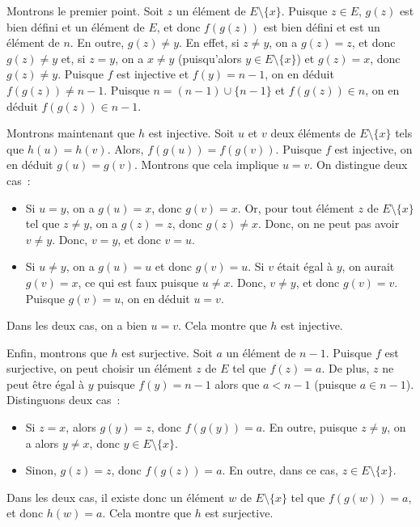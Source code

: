     Montrons le premier point. 
    Soit $z$ un élément de $E \setminus \lbrace x \rbrace$. 
    Puisque $z \in E$, $g(z)$ est bien défini et un élément de $E$, et donc $f(g(z))$ est bien défini et est un élément de $n$. 
    En outre, $g(z) \neq y$. 
    En effet, si $z \neq y$, on a $g(z) = z$, et donc $g(z) \neq y$ et, si $z = y$, on a $x \neq y$ (puisqu'alors $y \in E \setminus \lbrace x \rbrace$) et $g(z) = x$, donc $g(z) \neq y$. 
    Puisque $f$ est injective et $f(y) = n-1$, on en déduit $f(g(z)) \neq n-1$. 
    Puisque $n = (n-1) \cup \lbrace n-1 \rbrace$ et $f(g(z)) \in n$, on en déduit $f(g(z)) \in n-1$. 

    Montrons maintenant que $h$ est injective. 
    Soit $u$ et $v$ deux éléments de $E \setminus \lbrace x \rbrace$ tels que $h(u) = h(v)$. 
    Alors, $f(g(u)) = f(g(v))$. 
    Puisque $f$ est injective, on en déduit $g(u) = g(v)$. 
    Montrons que cela implique $u = v$. 
    On distingue deux cas : 
    \begin{itemize}[nosep]
        \item Si $u = y$, on a $g(u) = x$, donc $g(v) = x$. 
            Or, pour tout élément $z$ de $E \setminus \lbrace x \rbrace$ tel que $z \neq y$, on a $g(z) = z$, donc $g(z) \neq x$.
            Donc, on ne peut pas avoir $v \neq y$. 
            Donc, $v = y$, et donc $v = u$.
        \item Si $u \neq y$, on a $g(u) = u$ et donc $g(v) = u$.
            Si $v$ était égal à $y$, on aurait $g(v) = x$, ce qui est faux puisque $u \neq x$. 
            Donc, $v \neq y$, et donc $g(v) = v$. 
            Puisque $g(v) = u$, on en déduit $u = v$.
    \end{itemize}
    Dans les deux cas, on a bien $u = v$. 
    Cela montre que $h$ est injective. 

    Enfin, montrons que $h$ est surjective. 
    Soit $a$ un élément de $n-1$. 
    Puisque $f$ est surjective, on peut choisir un élément $z$ de $E$ tel que $f(z) = a$. 
    De plus, $z$ ne peut être égal à $y$ puisque $f(y) = n-1$ alors que $a < n-1$ (puisque $a \in n-1$). 
    Distinguons deux cas : 
    \begin{itemize}[nosep]
        \item Si $z = x$, alors $g(y) = z$, donc $f(g(y)) = a$. 
            En outre, puisque $z \neq y$, on a alors $y \neq x$, donc $y \in E \setminus \lbrace x \rbrace$.
        \item Sinon, $g(z) = z$, donc $f(g(z)) = a$.
            En outre, dans ce cas, $z \in E \setminus \lbrace x \rbrace$.
    \end{itemize}
    Dans les deux cas, il existe donc un élément $w$ de $E \setminus \lbrace x \rbrace$ tel que $f(g(w)) = a$, et donc $h(w) = a$.
    Cela montre que $h$ est surjective.

